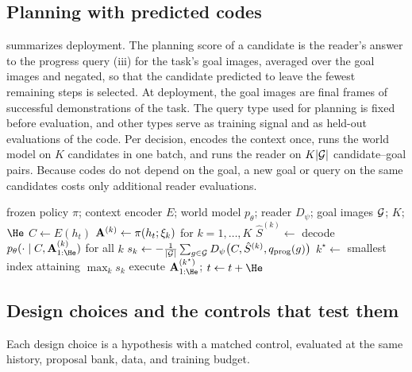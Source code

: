 \subsection{Planning with predicted codes}
\label{sec:planning}
 summarizes deployment.
The planning score of a candidate is the reader's answer to the progress query (iii) for the task's goal images, averaged over the goal images and negated, so that the candidate predicted to leave the fewest remaining steps is selected.
At deployment, the goal images are final frames of successful demonstrations of the task.
The query type used for planning is fixed before evaluation, and other types serve as training signal and as held-out evaluations of the code.
Per decision, \method encodes the context once, runs the world model on $K$ candidates in one batch, and runs the reader on $K|\mathcal{G}|$ candidate--goal pairs.
Because codes do not depend on the goal, a new goal or query on the same candidates costs only additional reader evaluations.

\begin{algorithm}[t]
\caption{Policy-guided planning with \method.}
\label{alg:cta}
\small
\begin{algorithmic}[1]
\Require frozen policy $\pi$; context encoder $E$; world model $p_\theta$; reader $D_\psi$; goal images $\mathcal{G}$; $K$; $\He$
  \State $C\gets E(h_t)$ 
  \State $\mathbf{A}^{(k)}\gets\pi(h_t;\xi_k)$ for $k=1,\dots,K$ 
  \State $\hat S^{(k)}\gets$ decode $p_\theta(\cdot\mid C,\bA^{(k)}_{1:\He})$ for all $k$ 
  \State $s_k\gets-\frac{1}{|\mathcal{G}|}\sum_{g\in\mathcal{G}}D_\psi\big(C,\hat S^{(k)},q_{\mathrm{prog}}(g)\big)$
  \State $k^\star\gets$ smallest index attaining $\max_k s_k$ 
  \State execute $\bA^{(k^\star)}_{1:\He}$; $t\gets t+\He$
\EndWhile
\end{algorithmic}
\end{algorithm}

\subsection{Design choices and the controls that test them}
\label{sec:rationale}
Each design choice is a hypothesis with a matched control, evaluated at the same history, proposal bank, data, and training budget.

